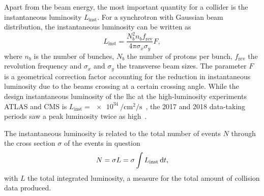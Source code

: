 Apart from the beam energy, the most important quantity for a collider is the instantaneous luminosity $L_\mathrm{inst}$. For a synchrotron with Gaussian beam distribution, the instantaneous luminosity can be written as
\begin{equation}
	L_\mathrm{inst} = \frac{N_b^2 n_b f_\mathrm{rev}}{4\pi\sigma_x\sigma_y} F,
	\label{eq:lumi}
\end{equation}
where $n_b$ is the number of bunches, $N_b$ the number of protons per bunch, $f_\mathrm{rev}$ the revolution frequency and $\sigma_x$ and $\sigma_y$ the transverse beam sizes. The parameter $F$ is a geometrical correction factor accounting for the reduction in instantaneous luminosity due to the beams crossing at a certain crossing angle. While the design instantaneous luminosity of the \gls{lhc} at the high-luminosity experiments ATLAS and CMS is $L_\mathrm{inst} = \SI{e34}{\per\cm\squared\per\second}$~\cite{Bruning:782076}, the 2017 and 2018 data-taking periods saw a peak luminosity twice as high~\cite{peak_lumi}.

The instantaneous luminosity is related to the total number of events $N$ through the cross section $\sigma$ of the events in question
\begin{equation}
	N = \sigma L = \sigma \int L_\mathrm{inst}\mathop{}\!\mathrm{d} t,
\end{equation}
with $L$ the total integrated luminosity, a measure for the total amount of collision data produced.

